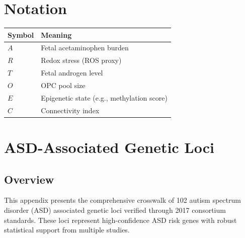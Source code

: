 \documentclass[12pt]{article}
\begin{document}
\section{Notation}
\begin{table}[h]
\centering
\begin{tabular}{@{}ll@{}}
\toprule
Symbol & Meaning \\
\midrule
$A$ & Fetal acetaminophen burden \\
$R$ & Redox stress (ROS proxy) \\
$T$ & Fetal androgen level \\
$O$ & OPC pool size \\
$E$ & Epigenetic state (e.g., methylation score) \\
$C$ & Connectivity index \\
\bottomrule
\end{tabular}
\end{table}

\section{ASD-Associated Genetic Loci}
\label{sec:asd-genes}

\subsection{Overview}
This appendix presents the comprehensive crosswalk of 102 autism spectrum disorder (ASD) associated genetic loci verified through 2017 consortium standards. These loci represent high-confidence ASD risk genes with robust statistical support from multiple studies.
\end{document}
